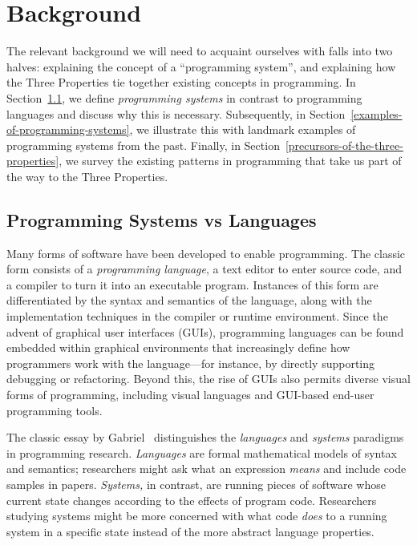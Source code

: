 \hypertarget{background}{%
\chapter{Background}\label{background}}

The relevant background we will need to acquaint ourselves with falls
into two halves: explaining the concept of a ``programming system'', and
explaining how the Three Properties tie together existing concepts in
programming. In Section~\ref{programming-systems-vs-languages}, we
define \emph{programming systems} in contrast to programming languages
and discuss why this is necessary. Subsequently, in
Section~\ref{examples-of-programming-systems}, we illustrate this with
landmark examples of programming systems from the past. Finally, in
Section~\ref{precursors-of-the-three-properties}, we survey the existing
patterns in programming that take us part of the way to the Three
Properties.

\hypertarget{programming-systems-vs-languages}{%
\section{Programming Systems vs
Languages}\label{programming-systems-vs-languages}}

Many forms of software have been developed to enable programming. The
classic form consists of a \emph{programming language}, a text editor to
enter source code, and a compiler to turn it into an executable program.
Instances of this form are differentiated by the syntax and semantics of
the language, along with the implementation techniques in the compiler
or runtime environment. Since the advent of graphical user interfaces
(GUIs), programming languages can be found embedded within graphical
environments that increasingly define how programmers work with the
language---for instance, by directly supporting debugging or
refactoring. Beyond this, the rise of GUIs also permits diverse visual
forms of programming, including visual languages and GUI-based end-user
programming tools.

The classic essay by Gabriel~\cite{PLrev} distinguishes the
\emph{languages} and \emph{systems} paradigms in programming research.
\emph{Languages} are formal mathematical models of syntax and semantics;
researchers might ask what an expression \emph{means} and include code
samples in papers. \emph{Systems,} in contrast, are running pieces of
software whose current state changes according to the effects of program
code. Researchers studying systems might be more concerned with what
code \emph{does} to a running system in a specific state instead of the
more abstract language properties.

